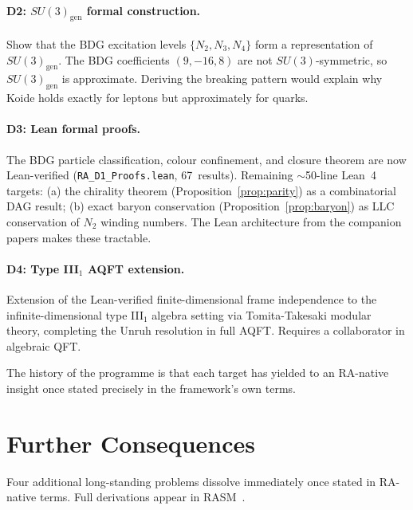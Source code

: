 \documentclass[11pt,a4paper]{article}
\begin{document}
\paragraph{D2: $SU(3)_{\mathrm{gen}}$ formal construction.}
Show that the BDG excitation levels $\{N_2, N_3, N_4\}$ form a
representation of $SU(3)_{\mathrm{gen}}$. The BDG coefficients
$(9,-16,8)$ are not $SU(3)$-symmetric, so $SU(3)_{\mathrm{gen}}$
is approximate. Deriving the breaking pattern would explain why
Koide holds exactly for leptons but approximately for quarks.

\paragraph{D3: Lean formal proofs.}
The BDG particle classification, colour confinement, and closure theorem are now Lean-verified (\texttt{RA\_D1\_Proofs.lean}, 67~results). Remaining $\sim$50-line Lean~4 targets: (a) the chirality theorem
(Proposition~\ref{prop:parity}) as a combinatorial DAG result; (b)
exact baryon conservation (Proposition~\ref{prop:baryon}) as LLC
conservation of $N_2$ winding numbers. The Lean architecture
from the companion papers makes these tractable.

\paragraph{D4: Type III$_1$ AQFT extension.}
Extension of the Lean-verified finite-dimensional frame independence
to the infinite-dimensional type III$_1$ algebra setting via
Tomita-Takesaki modular theory, completing the Unruh resolution
in full AQFT. Requires a collaborator in algebraic QFT.

The history of the programme is that each target has yielded to an
RA-native insight once stated precisely in the framework's own terms.

\section{Further Consequences}
\label{sec:further_consequences}

Four additional long-standing problems dissolve immediately once stated
in RA-native terms. Full derivations appear in RASM~\citep{Sandeman2026RASM}.
\end{document}
